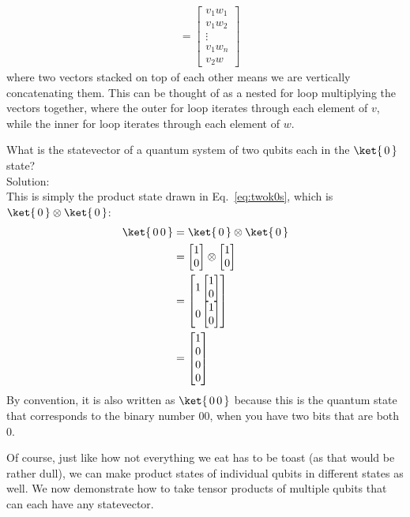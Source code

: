 \documentclass{article}
\newcommand{\soln}{{\\[1em] \hspace{-1em}\color{greentitle}\sffamily\large Solution: \\[0.5em]}}
\theoremstyle{definition}
\newcommand{\kz}[1]{\ket{\,#1\,}}
\begin{document}
\begin{align}
	&= \begin{bmatrix}v_1 w_1\\ v_1 w_2\\ \vdots \\ v_1 w_n \\ v_2 w\end{bmatrix}
\end{align}
where two vectors stacked on top of each other means we are vertically concatenating them.
This can be thought of as a nested for loop multiplying the vectors together, where the outer for loop iterates through each element of $v$, while the inner for loop iterates through each element of $w$.

\begin{example}\label{ex:kz00}
	What is the statevector of a quantum system of two qubits each in the $\kz0$ state?
	\soln \textnormal{This is simply the product state drawn in Eq.~\eqref{eq:twok0s}, which is $\kz0 \otimes \kz0$:}
	\begin{align}
		\ket{\,0\,0\,} &= \kz0 \otimes \kz0\\
		&= \begin{bmatrix}1\\ 0\end{bmatrix} \otimes \begin{bmatrix}1\\ 0\end{bmatrix}\\
		&= \begin{bmatrix}1\begin{bmatrix}1\\ 0\end{bmatrix}\\ 0\begin{bmatrix}1\\ 0\end{bmatrix}\end{bmatrix}\\
		&= \begin{bmatrix}1\\ 0\\ 0\\ 0\end{bmatrix}
	\end{align}
	By convention, it is also written as $\ket{\,0\,0\,}$ because this is the quantum state that corresponds to the binary number $00$, when you have two bits that are both $0$.
\end{example}

Of course, just like how not everything we eat has to be toast (as that would be rather dull), we can make product states of individual qubits in different states as well.
We now demonstrate how to take tensor products of multiple qubits that can each have any statevector.
\end{document}
